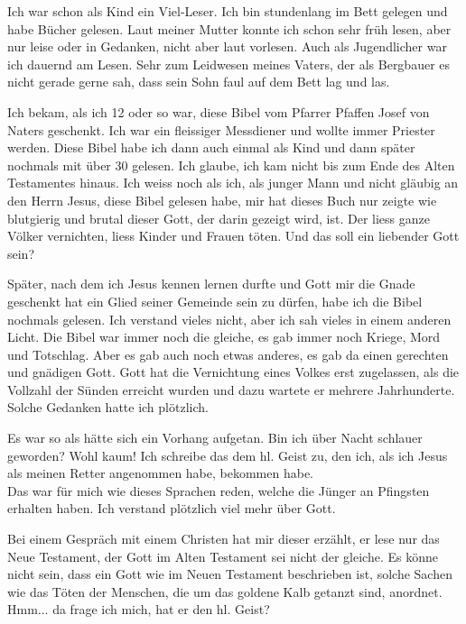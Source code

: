 \documentclass{../inc/mybib}
\begin{document}
Ich war schon als Kind ein Viel-Leser. Ich bin stundenlang im Bett gelegen und habe Bücher gelesen. Laut meiner Mutter konnte ich schon sehr früh lesen, aber nur leise oder in Gedanken, nicht aber laut vorlesen. Auch als Jugendlicher war ich dauernd am Lesen. Sehr zum Leidwesen meines Vaters, der als Bergbauer es nicht gerade gerne sah, dass sein Sohn faul auf dem Bett lag und las.

Ich bekam, als ich 12 oder so war, diese Bibel vom Pfarrer Pfaffen Josef von Naters geschenkt. Ich war ein fleissiger Messdiener und wollte immer Priester werden. Diese Bibel habe ich dann auch einmal als Kind und dann später nochmals mit über 30 gelesen. Ich glaube, ich kam nicht bis zum Ende des Alten Testamentes hinaus. Ich weiss noch als ich, als  junger Mann und nicht gläubig an den Herrn Jesus, diese Bibel gelesen habe, mir hat dieses Buch nur zeigte wie blutgierig und brutal dieser Gott, der darin gezeigt wird, ist. Der liess ganze Völker vernichten, liess Kinder und Frauen töten. Und das soll ein liebender Gott sein?

Später, nach dem ich Jesus kennen lernen durfte und Gott mir die Gnade geschenkt hat ein Glied seiner Gemeinde sein zu dürfen, habe ich die Bibel nochmals gelesen. Ich verstand vieles nicht, aber ich sah vieles in einem anderen Licht. Die Bibel war immer noch die gleiche, es gab immer noch Kriege, Mord und Totschlag. Aber es gab auch noch etwas anderes, es gab da einen gerechten und gnädigen Gott. Gott hat die Vernichtung eines Volkes erst zugelassen, als die Vollzahl der Sünden erreicht wurden und dazu wartete er mehrere Jahrhunderte. Solche Gedanken hatte ich plötzlich.

Es war so als hätte sich ein Vorhang aufgetan. Bin ich über Nacht schlauer geworden? Wohl kaum! Ich schreibe das dem hl. Geist zu, den ich, als ich Jesus als meinen Retter angenommen habe, bekommen habe.\\
Das war für mich wie dieses Sprachen reden, welche die Jünger an Pfingsten erhalten haben. Ich verstand plötzlich viel mehr über Gott.

Bei einem Gespräch mit einem Christen hat mir dieser erzählt, er lese nur das Neue Testament, der Gott im Alten Testament sei nicht der gleiche. Es könne nicht sein, dass ein Gott wie im Neuen Testament beschrieben ist, solche Sachen wie das Töten der Menschen, die um das goldene Kalb getanzt sind, anordnet. Hmm... da frage ich mich, hat er den hl. Geist? 
\end{document}
